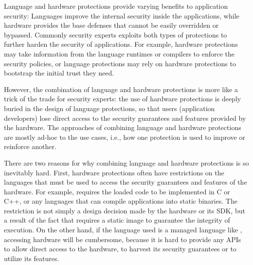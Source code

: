 \label{sec:concept}


Language and hardware protections provide varying benefits
to application security:
Languages improve the internal security inside the applications,
while hardware provides the base defenses that cannot be easily overridden or bypassed.
Commonly security experts exploits both types of protections
to further harden the security of applications.
For example, hardware protections may take information from the language runtimes or compilers to enforce the security policies,
or language protections may rely on hardware protections to bootstrap the initial trust they need. 

However, the combination of language and hardware protections is more
like a trick of the trade for security experts:
the use of hardware protections is deeply buried in the design of language protections,
so that users (application developers) lose direct access
to the security guarantees and features provided by the hardware.
The approaches of combining language and hardware protections are mostly ad-hoc to the use cases,
i.e., how one protection is used to improve or reinforce another.

There are two reasons for why combining language and hardware protections
is so inevitably hard.
First, hardware protections often have restrictions
on the languages that must be used
to access the security guarantees and features of the hardware.
For example, \sgx{} requires the loaded code to be implemented in C or C++,
or any languages that can compile applications into static binaries.
The restriction is not simply a design decision
made by the hardware or its SDK,
but a result of the fact that \sgx{} requires a static image to guarantee the integrity of execution.
On the other hand, if the language used is a managed language like \java{},
accessing \sgx{} hardware will be cumbersome,
because it is hard to provide any APIs to allow direct access to the \sgx{} hardware,
to harvest its security guarantees
or to utilize its features.

